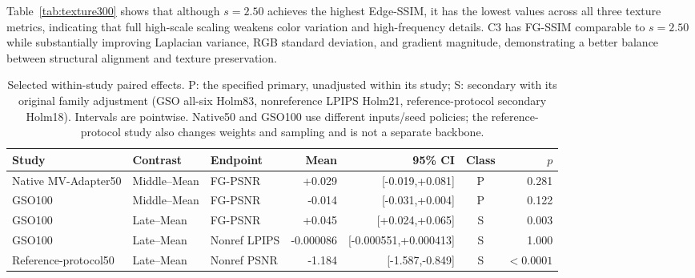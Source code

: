 \documentclass[times,twocolumn,final]{elsarticle}
\providecommand{\DIFdel}[1]{{\protect\color{red} \scriptsize #1}} %
\providecommand{\DIFaddbegin}{} %
\providecommand{\DIFaddend}{} %
\providecommand{\DIFdelbegin}{} %
\providecommand{\DIFdelend}{} %
\begin{document}
\DIFdelbegin \DIFdel{Table~\ref{tab:texture300} shows that although $s = 2.50$ achieves the highest Edge-SSIM, it has the lowest values across all three texture metrics, indicating that full high-scale scaling weakens color variation and high-frequency details. C3 has FG-SSIM comparable to $s = 2.50$ while substantially improving Laplacian variance, RGB standard deviation, and gradient magnitude, demonstrating a better balance between structural alignment and texture preservation. }\DIFdelend \DIFaddbegin \begin{table}[t]\centering\scriptsize\setlength{\tabcolsep}{3pt}
\caption{Selected within-study paired effects. P: the specified primary, unadjusted within its study; S: secondary with its original family adjustment (GSO all-six Holm83, nonreference LPIPS Holm21, reference-protocol secondary Holm18). Intervals are pointwise. Native50 and GSO100 use different inputs/seed policies; the reference-protocol study also changes weights and sampling and is not a separate backbone.}
\label{tab:interface-effects}
\begin{tabular}{lllrrcr}
\toprule Study & Contrast & Endpoint & Mean & 95\% CI & Class & $p$ \\
\midrule
Native MV-Adapter50 & Middle--Mean & FG-PSNR & +0.029 & [-0.019,+0.081] & P & 0.281 \\
GSO100 & Middle--Mean & FG-PSNR & -0.014 & [-0.031,+0.004] & P & 0.122 \\
GSO100 & Late--Mean & FG-PSNR & +0.045 & [+0.024,+0.065] & S & 0.003 \\
GSO100 & Late--Mean & Nonref LPIPS & -0.000086 & [-0.000551,+0.000413] & S & 1.000 \\
Reference-protocol50 & Late--Mean & Nonref PSNR & -1.184 & [-1.587,-0.849] & S & $<0.0001$ \\

\bottomrule\end{tabular}\end{table}
\DIFaddend 
\end{document}
